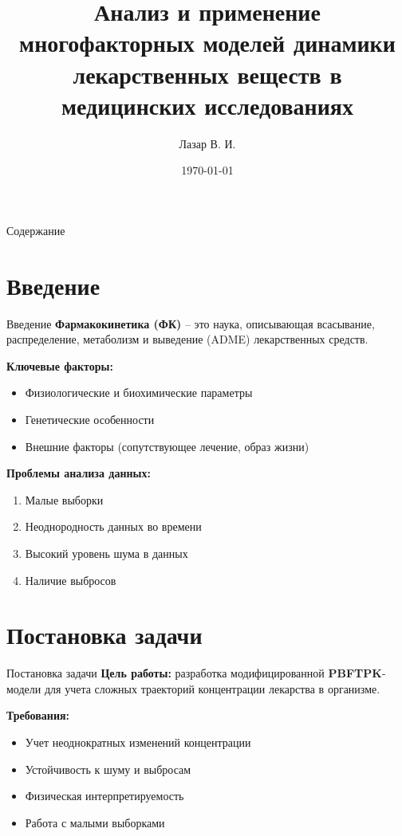 \documentclass[12pt]{beamer}
\title{Анализ и применение многофакторных моделей динамики лекарственных веществ в медицинских исследованиях}
\author{Лазар В. И.}
\date{\today}
\begin{document}
\begin{frame}
	\titlepage
\end{frame}

\begin{frame}{Содержание}
	\tableofcontents
\end{frame}

\section{Введение}
\begin{frame}{Введение}
	\textbf{Фармакокинетика (ФК)} – это наука, описывающая всасывание, распределение, метаболизм и выведение (ADME) лекарственных средств.

	\textbf{Ключевые факторы:}
	\begin{itemize}
		\item Физиологические и биохимические параметры
		\item Генетические особенности
		\item Внешние факторы (сопутствующее лечение, образ жизни)
	\end{itemize}

	\textbf{Проблемы анализа данных:}
	\begin{enumerate}
		\item Малые выборки
		\item Неоднородность данных во времени
		\item Высокий уровень шума в данных
		\item Наличие выбросов
	\end{enumerate}
\end{frame}

\section{Постановка задачи}
\begin{frame}{Постановка задачи}
	\textbf{Цель работы:} разработка модифицированной \textbf{PBFTPK}-модели для учета сложных траекторий концентрации лекарства в организме.

	\textbf{Требования:}
	\begin{itemize}
		\item Учет неоднократных изменений концентрации
		\item Устойчивость к шуму и выбросам
		\item Физическая интерпретируемость
		\item Работа с малыми выборками
	\end{itemize}
\end{frame}
\end{document}
